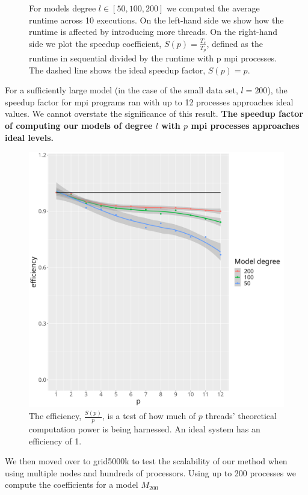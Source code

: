 \documentclass[a4paper]{article}
\theoremstyle{definition}
\begin{document}
\begin{figure}[h!]
\begin{minipage}{0.45\linewidth}
\end{minipage}
\caption{For models degree $l \in [50, 100, 200]$ we computed the average runtime across 10 executions. On the left-hand side we show how the runtime is affected
by introducing more threads. On the right-hand side we plot the speedup coefficient, $S(p) = \frac{T_s}{T_p}$, defined as the runtime in sequential divided by the 
runtime with p mpi processes. The dashed line shows the ideal speedup factor, $S(p) = p$.}
\end{figure}

For a sufficiently large model (in the case of the small data set, $l = 200$), the speedup factor for mpi programs ran with up to 12 processes approaches ideal values. We cannot
overstate the significance of this result. \textbf{The speedup factor of computing our models of degree $l$ with $p$ mpi processes approaches ideal levels.}

\newpage

\begin{figure}[h!]
    \centering
    \includegraphics[width=0.5\linewidth]{media/mpi_efficieny.png}
    \caption{The efficiency, $\frac{S(p)}{p}$, is a test of how much of $p$ threads' theoretical computation power is
    being harnessed. An ideal system has an efficiency of 1.}

\end{figure}

We then moved over to grid5000k to test the scalability of our method when using multiple nodes and hundreds
of processors. Using up to 200 processes we compute the coefficients for a model $M_{200}$
\end{document}
